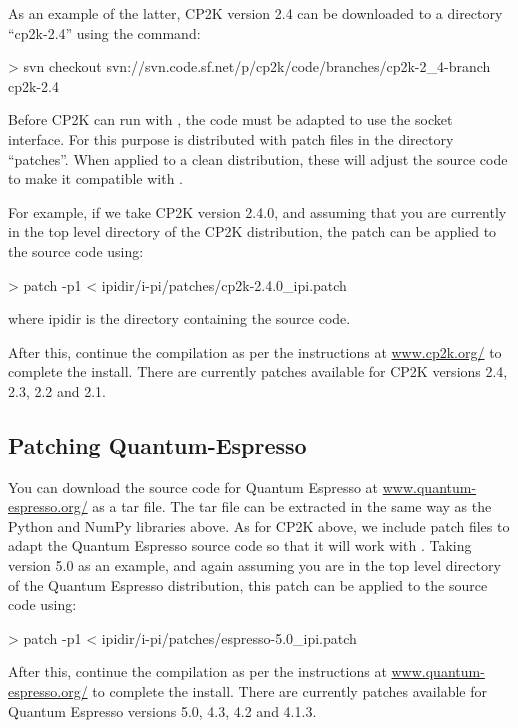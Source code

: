 \documentclass[11pt,english,fleqn]{report}
\newenvironment{code}{%
\footnotesize 
\verbatim
}{
\endverbatim
\normalsize
}
\begin{document}
As an example of the latter, CP2K version 2.4 can be downloaded to
a directory {}``cp2k-2.4'' using the command:

\begin{code}
> svn checkout svn://svn.code.sf.net/p/cp2k/code/branches/cp2k-2_4-branch cp2k-2.4
\end{code}

Before CP2K can run with \ipi, the code
must be adapted to use the socket interface. 
For this purpose \ipi is distributed with patch files in the
directory {}``patches''. When applied to a clean 
distribution, these will adjust the source code to make it
compatible with \ipi. 

For example, if we take CP2K 
version 2.4.0, and assuming that you are
currently in the top level directory of the CP2K distribution,
the patch can be applied to the source code using:

\begin{code}
> patch -p1 < ipidir/i-pi/patches/cp2k-2.4.0_ipi.patch
\end{code}
where ipidir is the directory containing the \ipi source code.

After this, continue the compilation as per the instructions at 
\url{www.cp2k.org/} to complete the install.
There are currently patches available for CP2K versions 2.4, 2.3, 2.2 and 2.1.

\subsection{Patching Quantum-Espresso}

You can download the source code for Quantum Espresso at \url{www.quantum-espresso.org/}
as a tar file. The tar file can be extracted in the same way as the Python and NumPy
libraries above. As for CP2K above, we include patch files to
adapt the Quantum Espresso source code so that it will work with \ipi.
Taking version 5.0 as an example, and again assuming you are in
the top level directory of the Quantum Espresso distribution,
this patch can be applied to the source code using:

\begin{code}
> patch -p1 < ipidir/i-pi/patches/espresso-5.0_ipi.patch
\end{code}

After this, continue the compilation as per the instructions at 
\url{www.quantum-espresso.org/} to complete the install.
There are currently patches available for 
Quantum Espresso versions 5.0, 4.3, 4.2 and 4.1.3.
\end{document}
